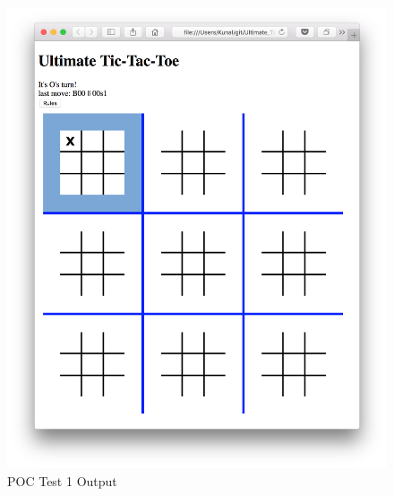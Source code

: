\documentclass[12pt, titlepage]{article}
\begin{document}
\begin{figure}
  \includegraphics[width=\linewidth]{Figures/Test1-output.png}
  \caption{POC Test 1 Output}
  \label{fig:Test1_output}
\end{figure}
\end{document}
